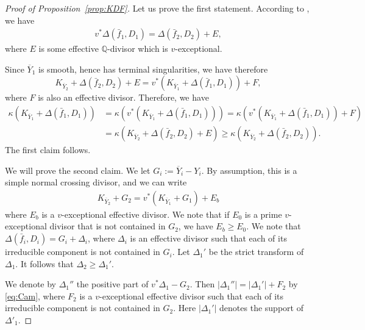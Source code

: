 \documentclass[11pt,english]{smfart}
\theoremstyle{plain}
\theoremstyle{definition}
\theoremstyle{remark}
\numberwithin{equation}{subsection}
\theoremstyle{plain}
\newcommand{\bQ}{\mathbb{Q}}
\begin{document}
\begin{proof}[Proof of Proposition~\ref{prop:KDF}]
Let us prove the first statement. According to \cite[Lemme 4.6]{Cam11},  
we have
\begin{align} \label{eq:Cam}
	 v^*\Delta(\bar{f}_{1}, D_{1})=\Delta(\bar{f}_{2}, D_{2})+E,
\end{align} 
where $E$ is some effective $\bQ$-divisor which is $v$-exceptional.  

Since \(\overline{Y}_{1}\) is smooth, hence has terminal singularities, we have therefore
\begin{equation} \label{eq:difforbcanonical}
K_{\overline{Y}_2}+\Delta(\bar{f}_{2}, D_{2})+E=v^*(K_{\overline{Y}_1}+\Delta(\bar{f}_{1}, D_{1}))+F,
\end{equation}
where  $F$ is also an effective  divisor.
Therefore, we have
\begin{align*}
	\kappa(K_{\overline{Y}_1}+\Delta(\bar{f}_{1}, D_{1})) & = \kappa(v^*(K_{\overline{Y}_1}+\Delta(\bar{f}_{1}, D_{1}))) =\kappa(v^*(K_{\overline{Y}_1}+\Delta(\bar{f}_{1}, D_{1}))+F)\\  &=\kappa(K_{\overline{Y}_2}+\Delta(\bar{f}_{2}, D_{2})+E)\geq \kappa(K_{\overline{Y}_2}+\Delta(\bar{f}_{2}, D_{2})).
\end{align*} 
The first claim follows.
\medskip

	We will prove the second claim.  We let \(G_{i} := \overline{Y}_{i} - Y_{i}\). By assumption, this is a simple normal crossing divisor, and we can write
\begin{align}\label{eq:canonical formula}
	 	K_{\overline{Y}_{2}} + G_{2} = v^{\ast}(K_{\overline{Y}_{1}} + G_{1}) +E_b
\end{align} 
	where \(E_b\) is a  \(v\)-exceptional effective divisor. We note that if $E_0$ is a prime \(v\)-exceptional   divisor that is not contained in $G_2$, we have $E_b\geq E_0$. We note that 
	$\Delta(\bar{f}_i,D_i)=G_i+\Delta_i$, where $\Delta_i$ is an effective divisor such that each of its irreducible component is not contained in $G_i$.      
Let $\Delta_1'$ be the strict transform of $\Delta_1$. It follows that  
 $
\Delta_2\geq \Delta_1'.
$  

We denote by $\Delta_1''$ the positive part of $v^*\Delta_1-G_2$. Then    
$|\Delta_1''|=|\Delta_1'|+F_2 
$ 
by \eqref{eq:Cam}, where $F_2$ is  a \(v\)-exceptional   effective divisor such that each of its irreducible component is not contained in $G_2$.   Here $|\Delta_1'|$ denotes the support of $\Delta'_1$.   
 

\end{proof}
\end{document}
